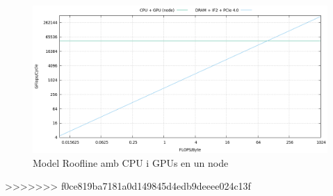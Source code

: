 \begin{figure}[H]
    \centering
    \includegraphics[width=\textwidth]{img/roofline_cpu_gpun}
    \caption{Model Roofline amb CPU i GPUs en un node}
    \label{fig:summary}
\end{figure}

%
>>>>>>> f0ce819ba7181a0d149845d4edb9deeee024c13f
